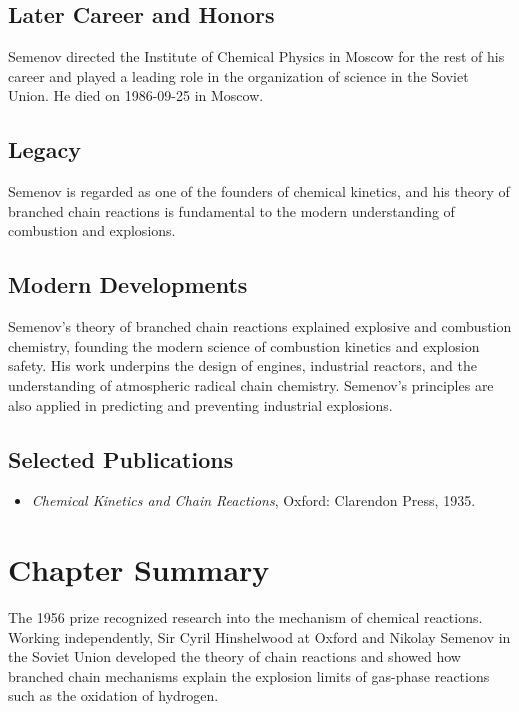 \subsection*{Later Career and Honors}

Semenov directed the Institute of Chemical Physics in Moscow for the rest of his career and played a leading role in the organization of science in the Soviet Union. He died on 1986-09-25 in Moscow.

\subsection*{Legacy}

Semenov is regarded as one of the founders of chemical kinetics, and his theory of branched chain reactions is fundamental to the modern understanding of combustion and explosions.

\subsection*{Modern Developments}

Semenov's theory of branched chain reactions explained explosive and combustion chemistry, founding the modern science of combustion kinetics and explosion safety. His work underpins the design of engines, industrial reactors, and the understanding of atmospheric radical chain chemistry. Semenov's principles are also applied in predicting and preventing industrial explosions.

\subsection*{Selected Publications}

\begin{itemize}

\item \emph{Chemical Kinetics and Chain Reactions}, Oxford: Clarendon Press, 1935.

\end{itemize}

\clearpage

\section*{Chapter Summary}

The 1956 prize recognized research into the mechanism of chemical reactions. Working independently, Sir Cyril Hinshelwood at Oxford and Nikolay Semenov in the Soviet Union developed the theory of chain reactions and showed how branched chain mechanisms explain the explosion limits of gas-phase reactions such as the oxidation of hydrogen.


